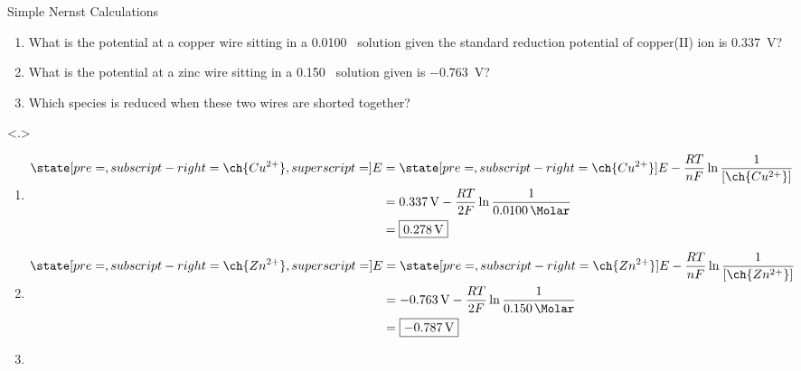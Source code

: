 \documentclass[notes=show]{beamer}
\begin{document}
\begin{frame}{Simple Nernst Calculations}
	\begin{enumerate}[<+->]
		\item What is the potential at a copper wire sitting in a
			\SI{0.0100}{\Molar}~ solution given the
			standard reduction potential of copper(II) ion is
			\SI{0.337}{\volt}?
			
			\vfill

		\item What is the potential at a zinc wire sitting in a
			\SI{0.150}{\Molar}~ solution given
			 is
			\SI{-0.763}{\volt}?

			\vfill

		\item Which species is reduced when these two wires are shorted
			together?

			\vspace{3em}
	\end{enumerate}

	{
	\begin{enumerate}
		\item \begin{align*}
				\state[pre=,subscript-right=\ch{Cu^{2+}},superscript=]{E}
				&= \state[pre=,subscript-right=\ch{Cu^{2+}}]{E} -
				\frac{RT}{nF} \ln \frac{1}{[\ch{Cu^{2+}}]} \\
				&= \SI{0.337}{\volt} - \frac{RT}{2F} \ln
				\frac{1}{\SI{0.0100}{\Molar}} \\
				&= \fbox{\SI{0.278}{\volt}}
			\end{align*}
		\item \begin{align*}
				\state[pre=,subscript-right=\ch{Zn^{2+}},superscript=]{E}
				&= \state[pre=,subscript-right=\ch{Zn^{2+}}]{E} -
				\frac{RT}{nF} \ln \frac{1}{[\ch{Zn^{2+}}]} \\
				&= \SI{-0.763}{\volt} - \frac{RT}{2F} \ln
				\frac{1}{\SI{0.150}{\Molar}} \\
				&= \fbox{\SI{-0.787}{\volt}}
			\end{align*}
		\item {}

	\end{enumerate}}
\end{frame}

\clearpage

\end{document}
